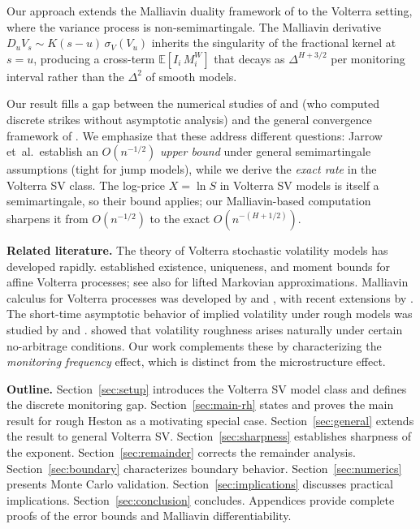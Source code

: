 \documentclass[12pt]{article}
\theoremstyle{definition}
\newcommand{\E}{\mathbb{E}}
\begin{document}
Our approach extends the Malliavin duality framework of
\citet{AlosFukasawa2021} to the Volterra setting, where the
variance process is non-semimartingale. The Malliavin derivative
$D_u V_s \sim K(s{-}u)\,\sigma_V(V_u)$
inherits the singularity of the fractional kernel at $s = u$,
producing a cross-term $\E[I_i\, M_i^W]$ that decays as
$\Delta^{H+3/2}$ per monitoring interval rather than the $\Delta^2$
of smooth models.

Our result fills a gap between the numerical studies of
\citet{XiWong2021} and \citet{ZhuangHuang2025}
(who computed discrete strikes without asymptotic analysis)
and the general convergence framework of
\citet{JarrowKchiaProtte2013}.
We emphasize that these address different questions:
Jarrow et~al.\ establish an $O(n^{-1/2})$ \emph{upper bound}
under general semimartingale assumptions (tight for jump models),
while we derive the \emph{exact rate} in the Volterra SV class.
The log-price $X = \ln S$ in Volterra SV models is itself a
semimartingale, so their bound applies; our Malliavin-based
computation sharpens it from $O(n^{-1/2})$ to the exact
$O(n^{-(H+1/2)})$.

\medskip

\noindent\textbf{Related literature.}
The theory of Volterra stochastic volatility models has developed
rapidly.
\citet{AbiJaberLarssonPulido2021} established existence, uniqueness,
and moment bounds for affine Volterra processes; see also
\citet{AbiJaberElEuch2019} for lifted Markovian approximations.
Malliavin calculus for Volterra processes was developed by
\citet{AlosLeonVives2007} and \citet{Nualart2006}, with recent
extensions by \citet{ViensZhang2019}.
The short-time asymptotic behavior of implied volatility under rough
models was studied by \citet{FordeLarterRaval2022} and
\citet{FrizGassiatPigato2022}.
\citet{Fukasawa2021} showed that volatility roughness arises
naturally under certain no-arbitrage conditions.
Our work complements these by characterizing the \emph{monitoring
frequency} effect, which is distinct from the microstructure effect.

\medskip

\noindent\textbf{Outline.}
Section~\ref{sec:setup} introduces the Volterra SV model class and
defines the discrete monitoring gap.
Section~\ref{sec:main-rh} states and proves the main result for rough
Heston as a motivating special case.
Section~\ref{sec:general} extends the result to general Volterra SV.
Section~\ref{sec:sharpness} establishes sharpness of the exponent.
Section~\ref{sec:remainder} corrects the remainder analysis.
Section~\ref{sec:boundary} characterizes boundary behavior.
Section~\ref{sec:numerics} presents Monte Carlo validation.
Section~\ref{sec:implications} discusses practical implications.
Section~\ref{sec:conclusion} concludes.
Appendices provide complete proofs of the error bounds and
Malliavin differentiability.
\end{document}
